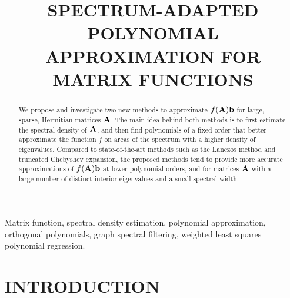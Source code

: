 \documentclass{article}
\title{SPECTRUM-ADAPTED POLYNOMIAL APPROXIMATION FOR MATRIX FUNCTIONS}
\begin{document}
\ninept
%
\maketitle
%
\begin{abstract}
We propose and investigate two new methods to approximate $f({\bf A}){\bf b}$ for large, sparse, Hermitian matrices ${\bf A}$. The main idea behind both methods is to first estimate the spectral density of ${\bf A}$, and then find polynomials of a fixed order that better approximate the function $f$ on areas of the spectrum with a higher density of eigenvalues. %
Compared to state-of-the-art methods such as the Lanczos method and truncated Chebyshev expansion, the proposed methods tend to provide more accurate approximations of $f({\bf A}){\bf b}$ at lower polynomial orders, and for matrices ${\bf A}$ with a large number of distinct interior eigenvalues and a small spectral width. 
\end{abstract}
%
\begin{keywords}
Matrix function, spectral density estimation, polynomial approximation, orthogonal polynomials, graph spectral filtering, weighted least squares polynomial regression.
\end{keywords}
%
\section{INTRODUCTION} \label{Se:intro}
\end{document}
